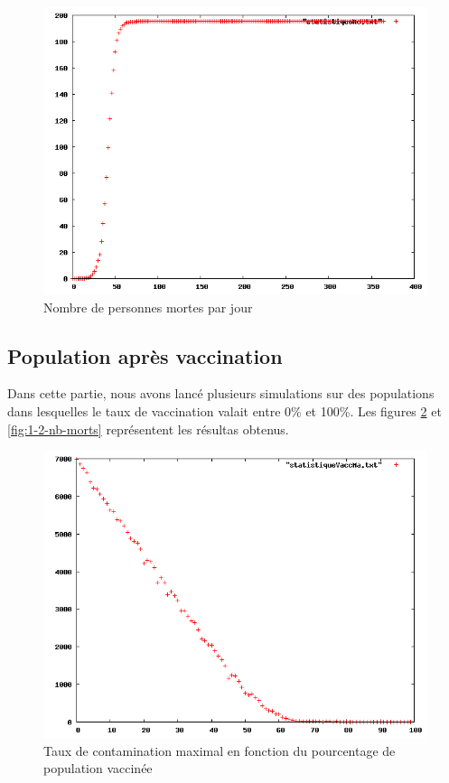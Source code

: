 \documentclass[12pt,a4paper,titlepage]{report}
\begin{document}
\begin{figure}[htbp] 
  \centering
  \includegraphics[width=15cm]{1-1-statistiqueMo.png}
  \caption{Nombre de personnes mortes par jour}
  \label{fig:1-1-nb-morts}
\end{figure}

\subsection*{Population après vaccination}
Dans cette partie, nous avons lancé plusieurs simulations sur des populations dans 
lesquelles  le taux de vaccination valait entre 0\% et 100\%. Les figures  \ref{fig:1-2-nb-malades} 
et \ref{fig:1-2-nb-morts} représentent les résultas obtenus.

\begin{figure}[htbp] 
  \centering
  \includegraphics[width=15cm]{1-2-statistiqueMa.png}
  \caption{Taux de contamination maximal en fonction du pourcentage de population vaccinée}
  \label{fig:1-2-nb-malades}
\end{figure}
\end{document}
